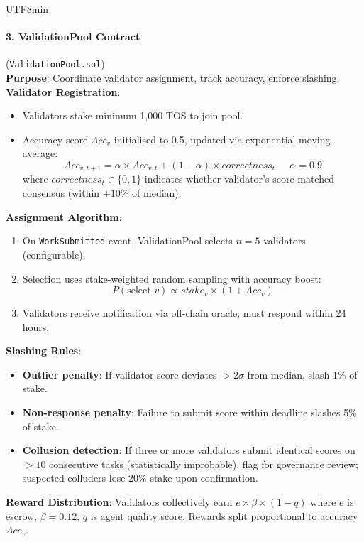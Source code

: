 \documentclass[11pt]{article}
\begin{document}
\begin{CJK}{UTF8}{min}
\paragraph{3. ValidationPool Contract} (\texttt{ValidationPool.sol})\\
\textbf{Purpose}: Coordinate validator assignment, track accuracy, enforce slashing.\\
\textbf{Validator Registration}:
\begin{itemize}[noitemsep]
  \item Validators stake minimum 1,000 TOS to join pool.
  \item Accuracy score $Acc_v$ initialised to 0.5, updated via exponential moving average:
    \begin{equation}
    Acc_{v,t+1} = \alpha \times Acc_{v,t} + (1-\alpha) \times correctness_t, \quad \alpha = 0.9
    \end{equation}
    where $correctness_t \in \{0,1\}$ indicates whether validator's score matched consensus (within $\pm10\%$ of median).
\end{itemize}
\textbf{Assignment Algorithm}:
\begin{enumerate}[noitemsep]
  \item On \texttt{WorkSubmitted} event, ValidationPool selects $n=5$ validators (configurable).
  \item Selection uses stake-weighted random sampling with accuracy boost:
    \begin{equation}
    P(\text{select } v) \propto stake_v \times (1 + Acc_v)
    \end{equation}
  \item Validators receive notification via off-chain oracle; must respond within 24 hours.
\end{enumerate}
\textbf{Slashing Rules}:
\begin{itemize}[noitemsep]
  \item \textbf{Outlier penalty}: If validator score deviates $>2\sigma$ from median, slash 1\% of stake.
  \item \textbf{Non-response penalty}: Failure to submit score within deadline slashes 5\% of stake.
  \item \textbf{Collusion detection}: If three or more validators submit identical scores on $>10$ consecutive tasks (statistically improbable), flag for governance review; suspected colluders lose 20\% stake upon confirmation.
\end{itemize}
\textbf{Reward Distribution}: Validators collectively earn $e \times \beta \times (1-q)$ where $e$ is escrow, $\beta=0.12$, $q$ is agent quality score. Rewards split proportional to accuracy $Acc_v$.


\end{CJK}
\end{document}
